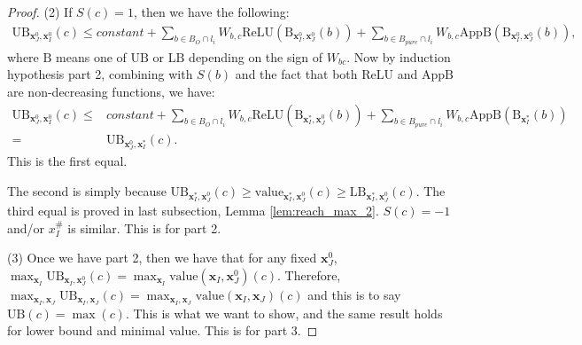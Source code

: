 \documentclass[]{article}
\newtheorem{lemma}{Lemma}
\theoremstyle{definition}
\newcommand{\ReLU}{\mathrm{ReLU}}
\newcommand{\Val}{\mathrm{value}}
\newcommand{\UB}{\mathrm{UB}}
\newcommand{\LB}{\mathrm{LB}}
\newcommand{\B}{\mathrm{B}}
\begin{document}
\begin{proof}
				(2) If $S(c)=1$, then we have the following:	\begin{align*}
					\mathrm{UB}_{\boldsymbol{x}^0_J,\boldsymbol{x}^0_I}(c) \leq constant + \sum_{b\in B_O\cap l_i} W_{b,c}\ReLU(\B_{\boldsymbol{x}^0_I,\boldsymbol{x}^0_J}(b)) + \sum_{b\in B_{pure}\cap l_{i}} W_{b,c} \mathrm{AppB}(\B_{\boldsymbol{x}^0_I,\boldsymbol{x}^0_J}(b)),
				\end{align*}where $\B$ means one of $\UB$ or $\LB$ depending on the sign of $W_{bc}$. Now by induction hypothesis part 2, combining with $S(b)$ and the fact that both $\ReLU$ and $\mathrm{AppB}$ are non-decreasing functions, we have:\begin{align*}
					\mathrm{UB}_{\boldsymbol{x}^0_J,\boldsymbol{x}^0_I}(c)\leq 
					&constant + \sum_{b\in B_O\cap l_i} W_{b,c}\ReLU(\B_{\boldsymbol{x}^*_I,\boldsymbol{x}^0_J}(b)) + \sum_{b\in B_{pure}\cap l_{i}} W_{b,c} \mathrm{AppB}(\B_{\boldsymbol{x}^*_I}(b))\\
					= & \mathrm{UB}_{\boldsymbol{x}^0_J,\boldsymbol{x}^*_I}(c). 
				\end{align*}  This is the first equal.
				
				The second is simply because $\UB_{\boldsymbol{x}^*_I,\boldsymbol{x}^0_J}(c)\geq \Val_{\boldsymbol{x}^*_I,\boldsymbol{x}^0_J}(c)\geq\LB_{\boldsymbol{x}^*_I,\boldsymbol{x}^0_J}(c)$.	The third equal is proved in last subsection, Lemma \ref{lem:reach_max_2}. $S(c)=-1$ and/or $x^\#_I$ is similar. This is for part 2.
				
				(3) Once we have part 2, then we have that for any fixed $\boldsymbol{x}^0_J$, $\max_{\boldsymbol{x}_I} \UB_{\boldsymbol{x}_I,\boldsymbol{x}^0_J}(c)= \max_{\boldsymbol{x}_I} \Val(\boldsymbol{x}_I,\boldsymbol{x}^0_J)(c)$. Therefore, $\max_{\boldsymbol{x}_I,\boldsymbol{x}_J} \UB_{\boldsymbol{x}_I,\boldsymbol{x}_J}(c)= \max_{\boldsymbol{x}_I,\boldsymbol{x}_J} \Val(\boldsymbol{x}_I,\boldsymbol{x}_J)(c)$ and this is to say $\UB(c)=\max(c)$. This is what we want to show, and the same result holds for lower bound and minimal value. This is for part 3.
				
				
				
				
			\end{proof}
			
			
			
			
\end{document}
